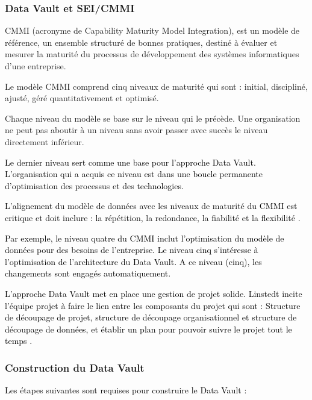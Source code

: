 \documentclass[a4paper,12pt]{report}
\begin{document}
\subsubsection{Data Vault  et SEI/CMMI }

\textcolor{black}{}
CMMI (acronyme de Capability Maturity Model Integration), est un modèle de référence, un ensemble structuré de bonnes pratiques, destiné à évaluer et mesurer la maturité du processus de développement des systèmes informatiques d’une entreprise. 

\textcolor{black}{}
Le modèle CMMI comprend cinq niveaux de maturité qui sont : initial, discipliné, ajusté, géré quantitativement et optimisé.

Chaque niveau du modèle se base sur le niveau qui le précède. Une organisation ne peut pas aboutir à un niveau sans avoir passer avec succès le niveau directement inférieur.

\textcolor{black}{Le dernier niveau sert comme une base pour l’approche Data Vault. L’organisation qui a acquis ce niveau est dans une boucle permanente d’optimisation  des processus et des technologies.}

\textcolor{black}{L’alignement du modèle de données avec les niveaux de maturité du CMMI est critique et doit inclure : la répétition, la redondance, la fiabilité et la flexibilité \citep{linstedt2009} .}

\textcolor{black}{Par exemple, le niveau quatre du CMMI inclut l’optimisation du modèle de données pour des besoins de l’entreprise. Le niveau cinq s’intéresse à l’optimisation de l’architecture du Data Vault. A ce niveau (cinq), les changements sont engagés automatiquement.}

\textcolor{black}{L’approche Data Vault met en place une gestion de projet solide. Linstedt incite l’équipe projet à faire le lien entre les composants du projet qui sont : Structure de découpage de projet,  structure de découpage organisationnel et structure de découpage de données, et établir un plan pour pouvoir suivre le projet tout le temps \citep{linstedt2009}.}

\subsubsection{Construction du Data Vault}

\textcolor{black}{Les étapes suivantes sont requises pour construire le Data Vault \citep{10} :
}
\end{document}
